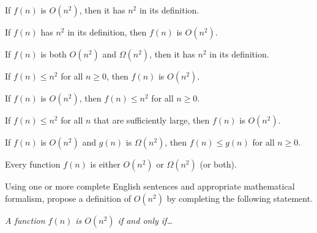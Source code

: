 \documentclass{tufte-handout}
\begin{document}
\begin{questions}
\item If $f(n)$ is $O(n^2)$, then it has $n^2$ in its definition.
\item If $f(n)$ has $n^2$ in its definition, then $f(n)$ is $O(n^2)$.
\item If $f(n)$ is both $O(n^2)$ and $\Omega(n^2)$, then it has $n^2$
  in its definition.
\item If $f(n) \leq n^2$ for all $n \geq 0$, then $f(n)$ is $O(n^2)$.
\item If $f(n)$ is $O(n^2)$, then $f(n) \leq n^2$ for all $n \geq 0$.
\item If $f(n) \leq n^2$ for all $n$ that are sufficiently large, then
  $f(n)$ is $O(n^2)$.
\item If $f(n)$ is $O(n^2)$ and $g(n)$ is $\Omega(n^2)$, then $f(n)
  \leq g(n)$ for all $n \geq 0$.
\item Every function $f(n)$ is either $O(n^2)$ or $\Omega(n^2)$ (or
  both).
  \newpage
\item Using one or more complete English sentences and appropriate
  mathematical formalism, propose a definition of $O(n^2)$ by
  completing the following statement.

  \emph{A function $f(n)$ is $O(n^2)$ if and only if\dots}
\end{questions}

\pause




\end{document}
